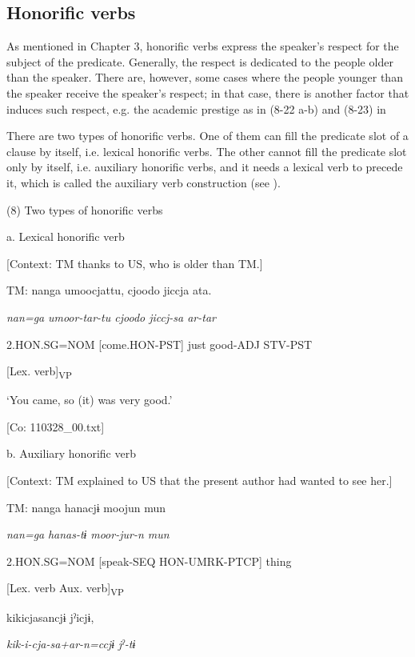 \subsection{Honorific verbs}

As mentioned in Chapter 3, honorific verbs express the speaker’s respect for the subject of the predicate. Generally, the respect is dedicated to the people older than the speaker. There are, however, some cases where the people younger than the speaker receive the speaker’s respect; in that case, there is another factor that induces such respect, e.g. the academic prestige as in (8-22 a-b) and (8-23) in 

There are two types of honorific verbs. One of them can fill the predicate slot of a clause by itself, i.e. lexical honorific verbs. The other cannot fill the predicate slot only by itself, i.e. auxiliary honorific verbs, and it needs a lexical verb to precede it, which is called the auxiliary verb construction (see ).

(8)  Two types of honorific verbs

  a.  Lexical honorific verb

    [Context: TM thanks to US, who is older than TM.]

    TM:  nanga  umoocjattu,  {\textbar}cjoodo{\textbar}  jiccja  ata.

      \textit{nan=ga}  \textit{umoor{}-tar-tu  cjoodo  jiccj-sa  ar-tar}

      2.HON.SG=NOM  [come.HON-PST]  just  good-ADJ  STV-PST

        [Lex. verb]\textsubscript{VP}      

      ‘You came, so (it) was very good.’

      [Co: 110328\_00.txt]

  b.  Auxiliary honorific verb

    [Context: TM explained to US that the present author had wanted to see her.]

    TM:  nanga  hanacjɨ  moojun  mun

      \textit{nan=ga}  \textit{hanas-tɨ}  \textit{moor{}-jur-n  mun}

      2.HON.SG=NOM  [speak-SEQ  HON-UMRK-PTCP]  thing

        [Lex. verb  Aux. verb]\textsubscript{VP}  

      kikicjasancjɨ  jˀicjɨ,

      \textit{kik-i-cja-sa+ar-n=ccjɨ}  \textit{jˀ-tɨ}

